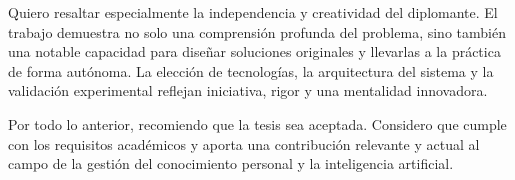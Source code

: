 Quiero resaltar especialmente la independencia y creatividad del diplomante. El trabajo demuestra no solo una comprensión profunda del problema, sino también una notable capacidad para diseñar soluciones originales y llevarlas a la práctica de forma autónoma. La elección de tecnologías, la arquitectura del sistema y la validación experimental reflejan iniciativa, rigor y una mentalidad innovadora.

Por todo lo anterior, recomiendo que la tesis sea aceptada. Considero que cumple con los requisitos académicos y aporta una contribución relevante y actual al campo de la gestión del conocimiento personal y la inteligencia artificial.
